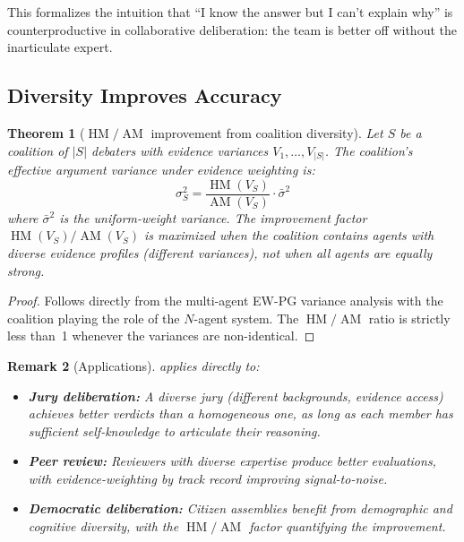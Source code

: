 \documentclass[11pt,a4paper]{article}
\newtheorem{theorem}{Theorem}[section]
\newtheorem{remark}[theorem]{Remark}
\DeclareMathOperator{\AM}{AM}
\DeclareMathOperator{\HM}{HM}
\begin{document}
This formalizes the intuition that ``I know the answer but I can't
explain why'' is counterproductive in collaborative deliberation:
the team is better off without the inarticulate expert.

\subsection{Diversity Improves Accuracy}

\begin{theorem}[$\HM/\AM$ improvement from coalition diversity]
\label{thm:diversity}
Let $S$ be a coalition of $|S|$ debaters with evidence variances
$V_1, \ldots, V_{|S|}$. The coalition's effective argument variance
under evidence weighting is:
\begin{equation}
    \sigma_S^2 = \frac{\HM(V_S)}{\AM(V_S)} \cdot \bar{\sigma}^2
\end{equation}
where $\bar{\sigma}^2$ is the uniform-weight variance. The improvement
factor $\HM(V_S)/\AM(V_S)$ is maximized when the coalition contains
agents with diverse evidence profiles (different variances), not when
all agents are equally strong.
\end{theorem}

\begin{proof}
Follows directly from the multi-agent EW-PG variance analysis
\cite{shcherbinin2026ewpg} with the coalition playing the role of the
$N$-agent system. The $\HM/\AM$ ratio is strictly less than~1 whenever
the variances are non-identical.
\end{proof}

\begin{remark}[Applications]
 applies directly to:
\begin{itemize}
    \item \textbf{Jury deliberation:} A diverse jury (different
    backgrounds, evidence access) achieves better verdicts than a
    homogeneous one, \emph{as long as} each member has sufficient
    self-knowledge to articulate their reasoning.
    \item \textbf{Peer review:} Reviewers with diverse expertise
    produce better evaluations, with evidence-weighting by track record
    improving signal-to-noise.
    \item \textbf{Democratic deliberation:} Citizen assemblies benefit
    from demographic and cognitive diversity, with the $\HM/\AM$ factor
    quantifying the improvement.
\end{itemize}
\end{remark}
\end{document}
